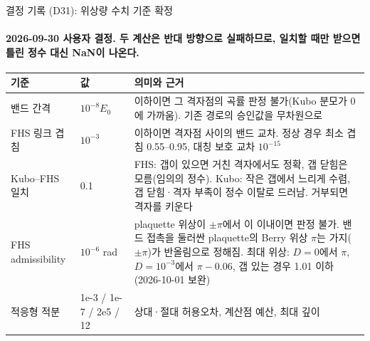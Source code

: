\begin{frame}[label=decisions-d31]{결정 기록 (D31): 위상량 수치 기준 확정}
  \framesubtitle{2026-09-30 사용자 결정. 두 계산은 반대 방향으로 실패하므로, 일치할 때만 받으면 틀린 정수 대신 NaN이 나온다.}
  \footnotesize\renewcommand{\arraystretch}{1.1}
  \begin{tabularx}{\textwidth}{@{}P{3.2cm}P{1.6cm}Y@{}}
    \toprule
    기준 & 값 & 의미와 근거 \\
    \midrule
    밴드 간격 & $10^{-8}E_0$ & 이하이면 그 격자점의 곡률 판정 불가(Kubo 분모가 0에 가까움). 기존 경로의 승인값을 무차원으로 \\
    FHS 링크 겹침 & $10^{-3}$ & 이하이면 격자점 사이의 밴드 교차. 정상 경우 최소 겹침 0.55--0.95, 대칭 보호 교차 $10^{-15}$ \\
    Kubo--FHS 일치 & 0.1 & FHS: 갭이 있으면 거친 격자에서도 정확, 갭 닫힘은 모름(임의의 정수). Kubo: 작은 갭에서 느리게 수렴, 갭 닫힘·격자 부족이 정수 이탈로 드러남. 거부되면 격자를 키운다 \\
    FHS admissibility & $10^{-6}$ rad & plaquette 위상이 $\pm\pi$에서 이 이내이면 판정 불가. 밴드 접촉을 둘러싼 plaquette의 Berry 위상 $\pi$는 가지($\pm\pi$)가 반올림으로 정해짐. 최대 위상: $D=0$에서 $\pi$, $D=10^{-3}$에서 $\pi-0.06$, 갭 있는 경우 1.01 이하 (2026-10-01 보완) \\
    적응형 적분 & 1e-3 / 1e-7 / 2e5 / 12 & 상대·절대 허용오차, 계산점 예산, 최대 깊이 \\
    \bottomrule
  \end{tabularx}
  \par\smallskip
\end{frame}

